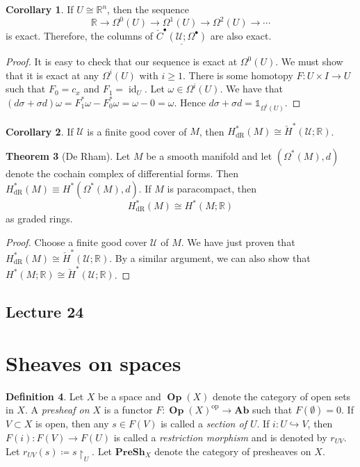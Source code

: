 \documentclass[10pt,letterpaper,cm]{nupset}
\theoremstyle{definition}
\newtheorem{definition}{Definition}[subsection]
\theoremstyle{theorem}
\newtheorem{theorem}[definition]{Theorem}
\newtheorem{corollary}[definition]{Corollary}
\theoremstyle{remark}
\newcommand{\U}{\mathcal U}
\newcommand{\R}{\mathbb{R}}
\newcommand{\1}{\mathbb{1}}
\newcommand{\0}{\vec 0}
\DeclareMathOperator{\id}{id}
\DeclareMathOperator{\dr}{dR}
\DeclareMathOperator{\op}{op}
\DeclareMathOperator{\Op}{\mathbf{Op}}
\begin{document}
\begin{corollary}
If $U \cong \R^n$, then the sequence $$\R \to \Omega^0(U) \to \Omega^1(U) \to \Omega^2(U) \to \cdots$$ is exact. Therefore, the columns of $\underline{\check{C}^{\bullet}(\U; \Omega^{\bullet})}$ are also exact.
\end{corollary}
\begin{proof}
It is easy to check that our sequence is exact at $\Omega^0(U)$. We must show that it is exact at any $\Omega^i(U)$ with $i\geq 1$. There is some homotopy $F: U \times I  \to U$ such that $F_0 = c_x$ and $F_1 = \id_U$.  Let $\omega \in \Omega^i(U)$. We have that $(d \sigma + \sigma d) \omega = F_1^{\ast} \omega - F_0^{\ast} \omega = \omega -0 =\omega$. Hence $d \sigma + \sigma d = \1_{\Omega^i(U)}$.
\end{proof}

\begin{corollary}
 If $\U$ is a finite good cover of $M$, then $H^{\ast}_{\dr}(M) \cong  \check{H}^{\ast}(\U; \R)$.
\end{corollary}

\begin{theorem}[De Rham]
Let $M$ be a smooth manifold and let $(\Omega^{\ast}(M), d)$ denote the cochain complex of differential forms. Then $H_{\dr}^{\ast}(M) \equiv H^{\ast}(\Omega^{\ast}(M), d)$.  If $M$ is  paracompact, then $$H^{\ast}_{\dr}(M) \cong H^{\ast}(M; \R)$$ as graded rings.
\end{theorem}
\begin{proof}
Choose a finite good cover $\U$ of $M$. We have just proven that $H^{\ast}_{\dr}(M) \cong  \check{H}^{\ast}(\U; \R)$. By a similar argument, we can also show that $H^{\ast}(M; \R) \cong \check{H}^{\ast}(\U; \R)$.
\end{proof}

\subsection{Lecture 24}


\section{Sheaves on spaces}

\begin{definition}
Let $X$ be a space and $\Op(X)$ denote the category of open sets in $X$. A \textit{presheaf on $X$} is a functor $F: \Op(X)^{\op} \to \mathbf{Ab}$ such that $F(\emptyset) =0$. If $V\subset X$ is open, then any $s\in F(V)$ is called a \textit{section of $U$}. If $i : U \hookrightarrow V$, then $F(i): F(V) \to F(U)$ is called a \textit{restriction morphism} and is denoted by $r_{UV}$. Let $r_{UV}(s)\coloneqq  s \restriction_U$. Let $\mathbf{PreSh}_X$ denote the category of presheaves on $X$.
\end{definition}
\end{document}
